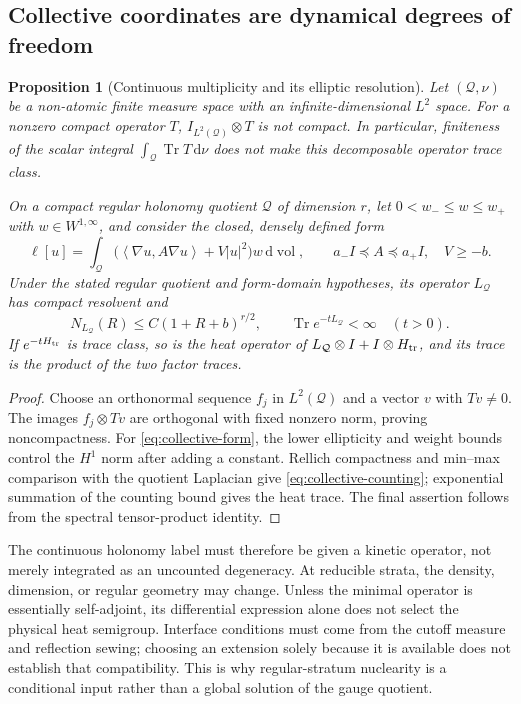 \documentclass[11pt,a4paper,oneside]{book}
\theoremstyle{plain}
\newtheorem{proposition}[theorem]{Proposition}
\theoremstyle{definition}
\theoremstyle{remark}
\newcommand{\dd}{\mathrm d}
\newcommand{\Tr}{\operatorname{Tr}}
\newcommand{\vol}{\operatorname{vol}}
\newcommand{\pair}[2]{\left\langle#1,#2\right\rangle}
\newcommand{\src}[2]{\cite{#1}}
\begin{document}
\subsection{Collective coordinates are dynamical degrees of freedom}
\begin{proposition}[Continuous multiplicity and its elliptic resolution]
\label{prop:collective-heat}
Let $(\mathcal Q,\nu)$ be a non-atomic finite measure space with an
infinite-dimensional $L^2$ space.  For a nonzero compact operator $T$,
$I_{L^2(\mathcal Q)}\otimes T$ is not compact.  In particular, finiteness
of the scalar integral $\int_{\mathcal Q}\Tr T\,\dd\nu$ does not make
this decomposable operator trace class.

On a compact regular holonomy quotient $\mathcal Q$ of dimension $r$,
let $0<w_-\le w\le w_+$ with $w\in W^{1,\infty}$, and consider the
closed, densely defined form
\begin{equation}
 \ell[u]=\int_{\mathcal Q}
 \bigl(\pair{\nabla u}{A\nabla u}+V|u|^2\bigr)w\,\dd\vol,
 \qquad a_-I\preceq A\preceq a_+I,\quad V\ge-b.
 \label{eq:collective-form}
\end{equation}
Under the stated regular quotient and form-domain hypotheses, its
operator $L_{\mathcal Q}$ has compact resolvent and
\begin{equation}
 N_{L_{\mathcal Q}}(R)\le C(1+R+b)^{r/2},
 \qquad \Tr e^{-tL_{\mathcal Q}}<\infty\quad(t>0).
 \label{eq:collective-counting}
\end{equation}
If $e^{-tH_{\rm tr}}$ is trace class, so is the heat operator of
$L_{\mathcal Q}\otimes I+I\otimes H_{\rm tr}$, and its trace is the
product of the two factor traces.
\end{proposition}
\begin{proof}
Choose an orthonormal sequence $f_j$ in $L^2(\mathcal Q)$ and a vector
$v$ with $Tv\ne0$.  The images $f_j\otimes Tv$ are orthogonal with
fixed nonzero norm, proving noncompactness.  For
\eqref{eq:collective-form}, the lower ellipticity and weight bounds
control the $H^1$ norm after adding a constant.  Rellich compactness
and min--max comparison with the quotient Laplacian give
\eqref{eq:collective-counting}; exponential summation of the counting
bound gives the heat trace.  The final assertion follows from the
spectral tensor-product identity.
\end{proof}
\src{R15}{thm:v15v98-holonomy,thm:v15v98-direct-integral,prop:v15v98-product}

The continuous holonomy label must therefore be given a kinetic operator,
not merely integrated as an uncounted degeneracy.  At reducible strata,
the density, dimension, or regular geometry may change.  Unless the
minimal operator is essentially self-adjoint, its differential expression
alone does not select the physical heat semigroup.  Interface conditions
must come from the cutoff measure and reflection sewing; choosing an
extension solely because it is available does not establish that
compatibility.  This is why regular-stratum nuclearity is a conditional
input rather than a global solution of the gauge quotient.
\src{R15}{prop:v15v98-interface,thm:v15v98-handoff}
\end{document}
